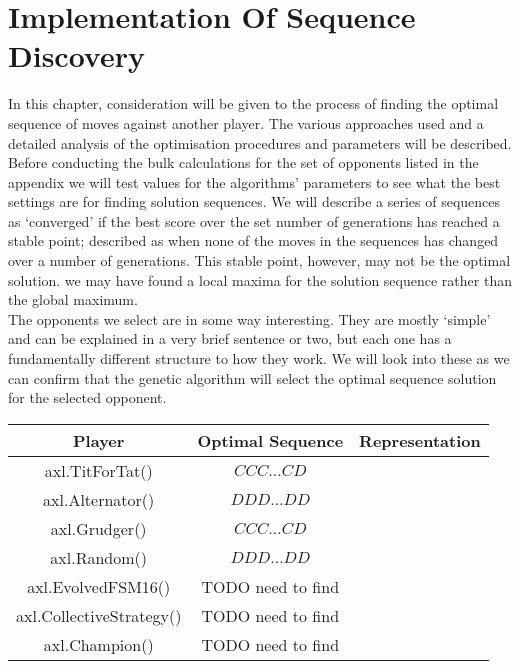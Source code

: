 \chapter{Implementation Of Sequence Discovery}\label{ch:implementation}
In this chapter, consideration will be given to the process of finding the optimal sequence of moves against another player.
The various approaches used and a detailed analysis of the optimisation procedures and parameters will be described.\\

Before conducting the bulk calculations for the set of opponents listed in the appendix we will test values for the algorithms' parameters to see what the best settings are for finding solution sequences.
We will describe a series of sequences as `converged' if the best score over the set number of generations has reached a stable point;
described as when none of the moves in the sequences has changed over a number of generations.
This stable point, however, may not be the optimal solution.
we may have found a local maxima for the solution sequence rather than the global maximum. \\

The opponents we select are in some way interesting.
They are mostly `simple' and can be explained in a very brief sentence or two, but each one has a fundamentally different structure to how they work.
We will look into these as we can confirm that the genetic algorithm will select the optimal sequence solution for the selected opponent. \\

\begin{table*}
    \centering
    \begin{tabular}{ccc}
        \toprule
        Player & Optimal Sequence & Representation\\
        \midrule
        axl.TitForTat()&\(CCC\ldots CD\)&\\
        axl.Alternator()&\(DDD\ldots DD\)&\\
        axl.Grudger()&\(CCC\ldots CD\)&\\
        axl.Random()&\(DDD\ldots DD\)&\\
        axl.EvolvedFSM16()&TODO need to find&\\
        axl.CollectiveStrategy()&TODO need to find&\\
        axl.Champion()&TODO need to find&\\
        \bottomrule
    \end{tabular}
\end{table*}

